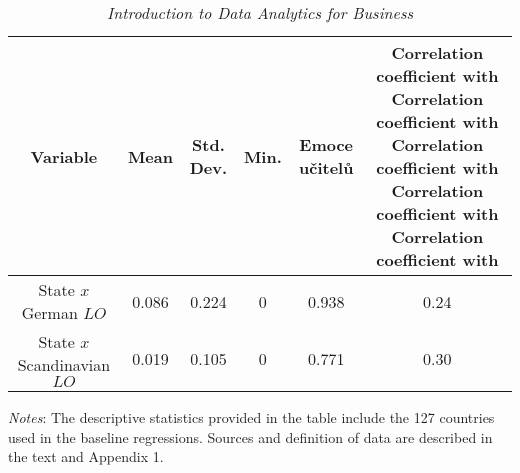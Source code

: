 \begin{landscape}
\begin{table}[htbp]
  \renewcommand\thetable{1}
  \caption{\textit{Introduction to Data Analytics for Business}}\label{tab1}
  \scriptsize
  {
    \centering
    \begin{tabularx}{\linewidth}{CCCCCC}
      \toprule
      Variable &
      Mean&
      Std. Dev.&
      Min.&
      Emoce učitelů &
      Correlation coefficient with Correlation coefficient with Correlation coefficient with Correlation coefficient with Correlation coefficient with  \\
      \midrule
      \midrule
      State $x$ German $LO$ &
      0.086&
      0.224&
      0&
      0.938&
      0.24 \\
      \midrule

      State $x$ Scandinavian $LO$ &
      0.019&
      0.105&
      0&
      0.771&
      0.30 \\
      \bottomrule
    \end{tabularx}

  }
  \smallskip
  \emph{Notes}: The descriptive statistics provided in the table include the 127 countries used in the baseline regressions.
  Sources and definition of data are described in the text and Appendix 1.

\end{table}
\end{landscape}
